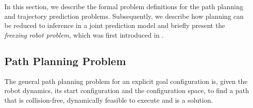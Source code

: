 In this section, we describe the formal problem definitions for the path planning and trajectory prediction problems. Subsequently, we describe how planning can be reduced to inference in a joint prediction model and briefly present the \textit{freezing robot problem}, which was first introduced in \cite{trautman10}.



\subsection{Path Planning Problem}
\label{sec:intro-path-plann-probl}
The general path planning problem for an explicit goal configuration is, given the robot dynamics, its start configuration and the configuration space, to find a path that is collision-free, dynamically feasible to execute and is a solution.


